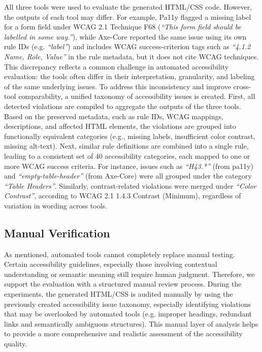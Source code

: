 \noindent
All three tools were used to evaluate the generated HTML/CSS code. 
However, the outputs of each tool may differ. For example, 
Pa11y flagged a missing label for a form field under WCAG
2.1 Technique F68 (\textit{``This form field should be labelled in some way.''}), 
while Axe-Core
reported the same issue using its own rule IDs (e.g. \textit{``label''}) and includes 
WCAG success-criterion
tags such as \textit{``4.1.2 Name, Role, Value''} in the rule metadata, but it does not cite WCAG
techniques. This discrepancy reflects a common challenge in automated accessibility evaluation:
the tools often differ in their interpretation, granularity, and labeling of the same underlying
issues.\newline
To address this inconsistency and improve cross-tool comparability, a 
unified taxonomy of accessibility issues is created. First, all 
detected violations are compiled to 
aggregate the outputs of the three tools. Based on the preserved 
metadata, such as rule IDs, WCAG mappings, descriptions, and affected
HTML elements, the violations are grouped into functionally 
equivalent categories (e.g., missing labels, insufficient color contrast,
missing alt-text). Next, similar rule definitions are combined 
into a single rule, leading to a consistent set of 40 
accessibility categories, each mapped to one or more WCAG 
success criteria. For instance, issues such as \textit{``H43.*''}
(from pa11y) and \textit{``empty-table-header''} (from Axe-Core) were all
grouped under the category \textit{``Table Headers''}. Similarly,
contrast-related violations were merged
under \textit{``Color Contrast''}, according to WCAG 2.1 1.4.3 Contrast (Minimum), 
regardless of variation in wording across tools. \newline

\begingroup
    
\endgroup

\subsection{Manual Verification}
As mentioned, automated tools cannot completely replace manual testing. 
Certain accessibility guidelines, especially those involving 
contextual understanding or semantic meaning still require 
human judgment. Therefore, we support the evaluation with a 
structured manual review process. During the experiments, the 
generated HTML/CSS is audited manually by using the previously 
created accessibility issue taxonomy, especially identifying 
violations that may be overlooked by automated tools 
(e.g. improper headings, redundant links and semantically 
ambiguous structures). This manual layer of analysis helps 
to provide a more comprehensive and realistic assessment of
the accessibility quality.

